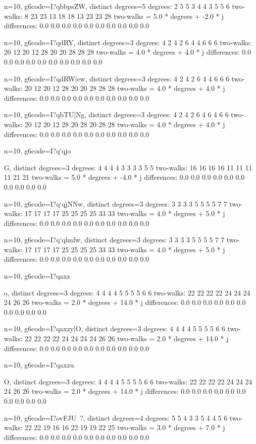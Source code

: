 {{{{{{{{{{n=10, g6code=I?qbbpsZW, distinct degrees=5
degrees: 2 5 5 3 4 4 3 5 5 6 
two-walks: 8 23 23 13 18 18 13 23 23 28 
two-walks = 5.0 * degrees + -2.0 * j
differences: 0.0 0.0 0.0 0.0 0.0 0.0 0.0 0.0 0.0 0.0 

n=10, g6code=I?qdRY\Mw, distinct degrees=3
degrees: 4 2 4 2 6 4 4 6 6 6 
two-walks: 20 12 20 12 28 20 20 28 28 28 
two-walks = 4.0 * degrees + 4.0 * j
differences: 0.0 0.0 0.0 0.0 0.0 0.0 0.0 0.0 0.0 0.0 

n=10, g6code=I?qdRW|ew, distinct degrees=3
degrees: 4 2 4 2 6 4 4 6 6 6 
two-walks: 20 12 20 12 28 20 20 28 28 28 
two-walks = 4.0 * degrees + 4.0 * j
differences: 0.0 0.0 0.0 0.0 0.0 0.0 0.0 0.0 0.0 0.0 

n=10, g6code=I?qbTU]Ng, distinct degrees=3
degrees: 4 2 4 2 6 4 6 4 6 6 
two-walks: 20 12 20 12 28 20 28 20 28 28 
two-walks = 4.0 * degrees + 4.0 * j
differences: 0.0 0.0 0.0 0.0 0.0 0.0 0.0 0.0 0.0 0.0 

n=10, g6code=I?q`qjo{G, distinct degrees=3
degrees: 4 4 4 4 3 3 3 3 5 5 
two-walks: 16 16 16 16 11 11 11 11 21 21 
two-walks = 5.0 * degrees + -4.0 * j
differences: 0.0 0.0 0.0 0.0 0.0 0.0 0.0 0.0 0.0 0.0 

n=10, g6code=I?q`qjNNw, distinct degrees=3
degrees: 3 3 3 3 5 5 5 5 7 7 
two-walks: 17 17 17 17 25 25 25 25 33 33 
two-walks = 4.0 * degrees + 5.0 * j
differences: 0.0 0.0 0.0 0.0 0.0 0.0 0.0 0.0 0.0 0.0 

n=10, g6code=I?q`qhnfw, distinct degrees=3
degrees: 3 3 3 3 5 5 5 5 7 7 
two-walks: 17 17 17 17 25 25 25 25 33 33 
two-walks = 4.0 * degrees + 5.0 * j
differences: 0.0 0.0 0.0 0.0 0.0 0.0 0.0 0.0 0.0 0.0 

n=10, g6code=I?qaxz{{o, distinct degrees=3
degrees: 4 4 4 4 5 5 5 5 6 6 
two-walks: 22 22 22 22 24 24 24 24 26 26 
two-walks = 2.0 * degrees + 14.0 * j
differences: 0.0 0.0 0.0 0.0 0.0 0.0 0.0 0.0 0.0 0.0 

n=10, g6code=I?qaxzy|O, distinct degrees=3
degrees: 4 4 4 4 5 5 5 5 6 6 
two-walks: 22 22 22 22 24 24 24 24 26 26 
two-walks = 2.0 * degrees + 14.0 * j
differences: 0.0 0.0 0.0 0.0 0.0 0.0 0.0 0.0 0.0 0.0 

n=10, g6code=I?qaxzu}O, distinct degrees=3
degrees: 4 4 4 4 5 5 5 5 6 6 
two-walks: 22 22 22 22 24 24 24 24 26 26 
two-walks = 2.0 * degrees + 14.0 * j
differences: 0.0 0.0 0.0 0.0 0.0 0.0 0.0 0.0 0.0 0.0 

n=10, g6code=I?ovFJU~?, distinct degrees=4
degrees: 5 5 4 3 3 5 4 4 5 6 
two-walks: 22 22 19 16 16 22 19 19 22 25 
two-walks = 3.0 * degrees + 7.0 * j
differences: 0.0 0.0 0.0 0.0 0.0 0.0 0.0 0.0 0.0 0.0 

}}}}}}}}}}}}

